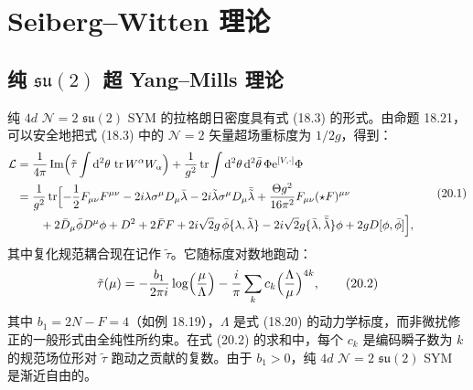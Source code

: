 
\chapter{Seiberg–Witten 理论}


\section{纯 $\mathfrak{su}(2)$ 超 Yang--Mills 理论}

纯 $4d$ $\mathcal{N}=2$ $\mathfrak{su}(2)$ SYM 的拉格朗日密度具有式 (18.3) 的形式。由命题 18.21，可以安全地把式 (18.3) 中的 $\mathcal{N}=2$ 矢量超场重标度为 $1/2g$，得到：
\begin{equation}
\begin{aligned}
\mathcal{L}&=\frac{1}{4\pi}\operatorname{Im}\Bigl(\tilde\tau\int\mathrm{d}^2\theta\,\operatorname{tr}W^\alpha W_\alpha\Bigr)+\frac{1}{g^2}\operatorname{tr}\int\mathrm{d}^2\theta\,\mathrm{d}^2\bar\theta\,\Phi \mathrm{e}^{[V,\cdot]}\Phi\\
&=\frac{1}{g^2}\operatorname{tr}\Bigl[-\frac{1}{2}F_{\mu\nu}F^{\mu\nu}-2i\lambda\sigma^\mu D_\mu\bar\lambda-2i\tilde\lambda\sigma^\mu D_\mu\bar{\tilde\lambda}+\frac{\Theta g^2}{16\pi^2}F_{\mu\nu}(\star F)^{\mu\nu}\\
&\qquad+2\bar D_\mu\bar\phi D^\mu\phi+D^2+2\bar FF+2i\sqrt2 g\,\bar\phi\{\lambda,\tilde\lambda\}-2i\sqrt2 g\{\bar\lambda,\bar{\tilde\lambda}\}\phi+2gD[\phi,\bar\phi]\Bigr],
\end{aligned}
\tag{20.1}
\end{equation}
其中复化规范耦合现在记作 $\tilde\tau$。它随标度对数地跑动：
\begin{equation}
\tilde\tau(\mu)=-\frac{b_1}{2\pi i}\log\Bigl(\frac{\mu}{\Lambda}\Bigr)-\frac{i}{\pi}\sum_k c_k\Bigl(\frac{\Lambda}{\mu}\Bigr)^{4k},
\tag{20.2}
\end{equation}
其中 $b_1=2N-F=4$（如例 18.19），$\Lambda$ 是式 (18.20) 的动力学标度，而非微扰修正的一般形式由全纯性所约束。在式 (20.2) 的求和中，每个 $c_k$ 是编码瞬子数为 $k$ 的规范场位形对 $\tilde\tau$ 跑动之贡献的复数。由于 $b_1>0$，纯 $4d$ $\mathcal{N}=2$ $\mathfrak{su}(2)$ SYM 是渐近自由的。

